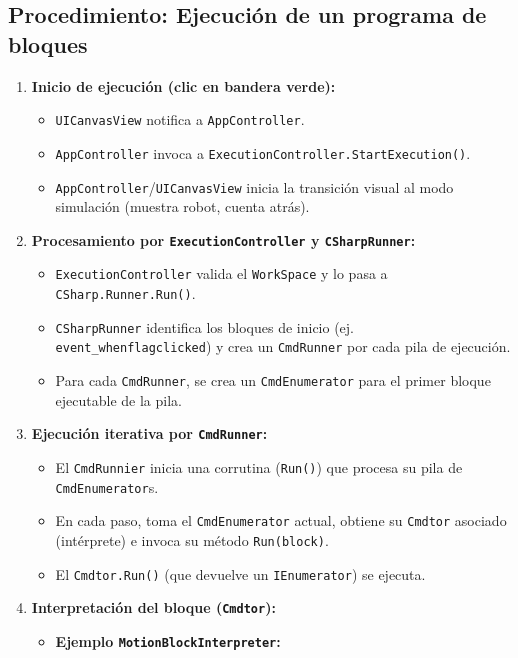 \subsection{Procedimiento: Ejecución de un programa de bloques}

\begin{enumerate}
	\item \textbf{Inicio de ejecución (clic en bandera verde):}
	\begin{itemize}
		\item \texttt{UICanvasView} notifica a \texttt{AppController}.
		\item \texttt{AppController} invoca a \texttt{ExecutionController.StartExecution()}.
		\item  \texttt{AppController}/\texttt{UICanvasView} inicia la transición visual al modo simulación (muestra robot, cuenta atrás).
	\end{itemize}
	\item \textbf{Procesamiento por \texttt{ExecutionController} y \texttt{CSharpRunner}:}
	\begin{itemize}
		\item \texttt{ExecutionController} valida el \texttt{WorkSpace} y lo pasa a \texttt{CSharp.Runner.Run()}.
		\item \texttt{CSharpRunner} identifica los bloques de inicio (ej. \texttt{event\_whenflagclicked}) y crea un \texttt{CmdRunner} por cada pila de ejecución.
		\item Para cada \texttt{CmdRunner}, se crea un \texttt{CmdEnumerator} para el primer bloque ejecutable de la pila.
	\end{itemize}
	\item \textbf{Ejecución iterativa por \texttt{CmdRunner}:}
	\begin{itemize}
		\item El \texttt{CmdRunnier} inicia una corrutina (\texttt{Run()}) que procesa su pila de \texttt{CmdEnumerator}s.
		\item En cada paso, toma el \texttt{CmdEnumerator} actual, obtiene su \texttt{Cmdtor} asociado (intérprete) e invoca su método \texttt{Run(block)}.
		\item El \texttt{Cmdtor.Run()} (que devuelve un \texttt{IEnumerator}) se ejecuta.
	\end{itemize}
	\item \textbf{Interpretación del bloque (\texttt{Cmdtor}):}
	\begin{itemize}
		\item \textbf{Ejemplo \texttt{MotionBlockInterpreter}:}

\end{itemize}
\end{enumerate}
